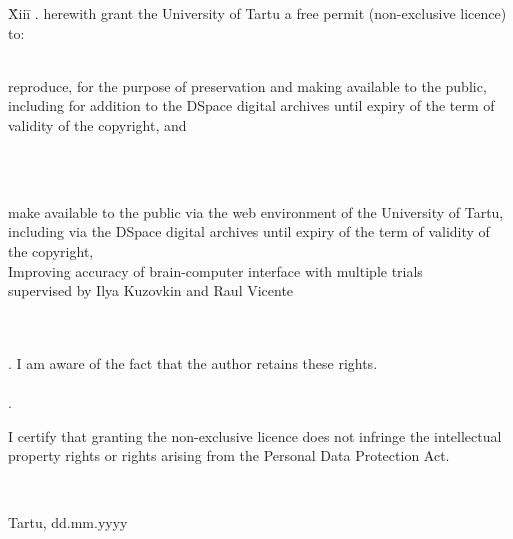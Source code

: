 \documentclass[12pt]{article}
\begin{document}
\begin{tabbing}
\= Xiii\=\kill
{}. \> herewith grant the University of Tartu a free permit (non-exclusive licence) to:\\\\ 

\> 
\begin{minipage}[t]{14.2cm}
reproduce, for the purpose of preservation and making available to the public, including for addition to the DSpace digital archives until expiry of the term of validity of the copyright, and
\end{minipage}
\\\\
\begin{minipage}[t]{14.2cm}
make available to the public via the web environment of the University of Tartu, including via the DSpace digital archives until expiry of the term of validity of the copyright,\\ 

Improving accuracy of brain-computer interface with multiple trials\\   

supervised by Ilya Kuzovkin and Raul Vicente

\end{minipage}\\\\ 
. \>I am aware of the fact that the author retains these rights.\\\\
. \>
\begin{minipage}[t]{14.2cm}
I certify that granting the non-exclusive licence does not infringe the intellectual property rights or rights arising from the Personal Data Protection Act. 
\end{minipage}\\
\end{tabbing}

\noindent
Tartu, dd.mm.yyyy
\end{document}
